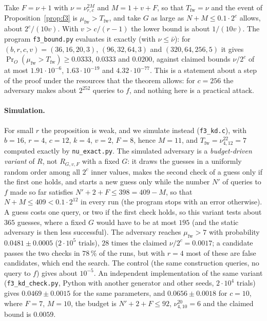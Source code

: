 \documentclass[11pt,a4paper]{article}
\theoremstyle{definition}
\theoremstyle{remark}
\newcommand{\mufw}{\mu_{\mathrm{fw}}}
\newcommand{\Tfw}{T_{\mathrm{fw}}}
\newcommand{\file}[1]{\texttt{#1}}
\begin{document}
Take $F = \nu + 1$ with $\nu = \nu^{2M}_{r,c}$ and $M = 1 + v + F$, so that $\Tfw = \nu$ and the event of
Proposition~\ref{prop:f3} is $\mufw > \Tfw$, and take $G$ as large as $N + M \le 0.1 \cdot 2^c$ allows, about
$2^c/(10v)$. With $v > c/(r-1)$ the lower bound is about $1/(10v)$. The program \file{f3\_bound.py} evaluates it
exactly (with $\nu \le \bar\nu$): for $(b, r, c, v) = (36, 16, 20, 3)$, $(96, 32, 64, 3)$ and $(320, 64, 256, 5)$ it gives
$\Pr_O(\mufw > \Tfw) \ge 0.0333$, $0.0333$ and $0.0200$, against claimed bounds $\nu/2^c$ of at most
$1.91 \cdot 10^{-6}$, $1.63 \cdot 10^{-19}$ and $4.32 \cdot 10^{-77}$. This is a statement about a step of the proof under
the resources that the theorem allows: for $c = 256$ the adversary makes about $2^{252}$ queries to $f$, and nothing here
is a practical attack.

\paragraph{Simulation.} For small $r$ the proposition is weak, and we simulate instead (\file{f3\_kd.c}), with $b = 16$,
$r = 4$, $c = 12$, $k = 4$, $v = 2$, $F = 8$, hence $M = 11$, and $\Tfw = \nu^{22}_{4,12} = 7$ computed exactly by
\file{nu\_exact.py}. The simulated adversary is a \emph{budget-driven variant} of $R$, not $R_{G,v,F}$ with a fixed $G$:
it draws the guesses in a uniformly random order among all $2^c$ inner values, makes the second check of a guess only
if the first one holds, and starts a new guess only while the number $N'$ of queries to $f$ made so far satisfies
$N' + 2 + F \le 398 = 409 - M$, so that $N + M \le 409 < 0.1 \cdot 2^{12}$ in every run (the program stops with an error
otherwise). A guess costs one query, or two if the first check holds, so this variant tests about $365$ guesses,
where a fixed $G$ would have to be at most $195$ (and the static adversary is then less successful).
The adversary reaches $\mufw > 7$ with probability $0.0481 \pm 0.0005$ ($2 \cdot 10^5$ trials), $28$ times the claimed
$\nu/2^c = 0.0017$; a candidate passes the two checks in $78\,\%$ of the runs, but with $r = 4$ most of these are false
candidates, which end the search. The control (the same construction queries, no query to $f$) gives about $10^{-5}$. An
independent implementation of the same variant (\file{f3\_kd\_check.py}, Python with another generator and other seeds,
$2 \cdot 10^4$ trials) gives $0.0469 \pm 0.0015$ for the same parameters, and $0.0656 \pm 0.0018$ for $c = 10$, where $F = 7$,
$M = 10$, the budget is $N' + 2 + F \le 92$, $\nu^{20}_{4,10} = 6$ and the claimed bound is $0.0059$.
\end{document}
